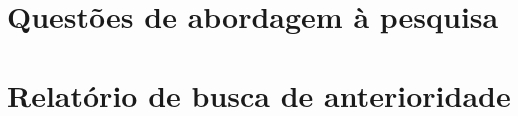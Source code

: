 \documentclass[
12pt,					%
openright,				%
twoside,				%
a4paper,				%
english,
brazil
]{ABNT/abntex2_report}
\begin{document}
	\newpage
	\begin{flushleft}
		\ABNTEXchapterfont\Large\textbf{\MakeUppercase\glosariotitlename}
	\end{flushleft}
	\vspace*{-36pt}
	\normalsize
	\normalfont
	\tableofcontents*
	\justify
	\setlength\beforechapskip{-24pt}
	\setlength\afterchapskip{12pt}
	\textual
	\pagestyle{plain}
	\normalsize
	\justify
	\normalfont
	
	
	
	
	
	
	
	
	
	\cleardoublepage
	\titleformat{\chapter}[display]{\vspace*{-24pt}\ABNTEXchapterfont\large\bfseries}{\chaptertitlename\ \thechapter}{12pt}{\Large}
	
	\apendices
	\justify
	\chapter{Questões de abordagem à pesquisa}
	\label{ape:quest}
	
	\anexos
	\justify
	\chapter{Relatório de busca de anterioridade}
	\label{ann:relant}
	
\end{document}
